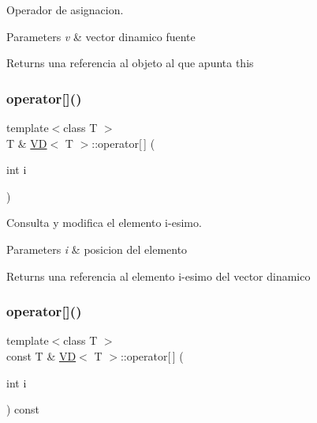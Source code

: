 Operador de asignacion. 


\begin{DoxyParams}{Parameters}
{\em v} & vector dinamico fuente \\
\hline
\end{DoxyParams}
\begin{DoxyReturn}{Returns}
una referencia al objeto al que apunta this 
\end{DoxyReturn}
\mbox{\label{class_v_d_a021495b46a5b59c7fd1e25653ab8f824}} 
\subsubsection{\texorpdfstring{operator[]()}{operator[]()}\hspace{0.1cm}{\footnotesize\ttfamily [1/2]}}
{\footnotesize\ttfamily template$<$class T $>$ \\
T \& \hyperlink{class_v_d}{VD}$<$ T $>$\+::operator\mbox{[}$\,$\mbox{]} (\begin{DoxyParamCaption}\item[{int}]{i }\end{DoxyParamCaption})}



Consulta y modifica el elemento i-\/esimo. 


\begin{DoxyParams}{Parameters}
{\em i} & posicion del elemento \\
\hline
\end{DoxyParams}
\begin{DoxyReturn}{Returns}
una referencia al elemento i-\/esimo del vector dinamico 
\end{DoxyReturn}
\mbox{\label{class_v_d_ab0c8adba584dcbb2f07171dedcfc395e}} 
\subsubsection{\texorpdfstring{operator[]()}{operator[]()}\hspace{0.1cm}{\footnotesize\ttfamily [2/2]}}
{\footnotesize\ttfamily template$<$class T $>$ \\
const T \& \hyperlink{class_v_d}{VD}$<$ T $>$\+::operator\mbox{[}$\,$\mbox{]} (\begin{DoxyParamCaption}\item[{int}]{i }\end{DoxyParamCaption}) const}



